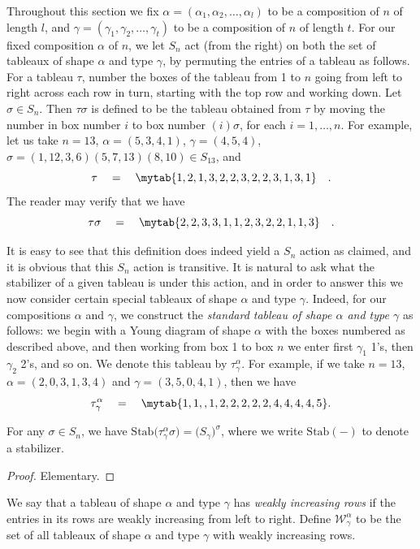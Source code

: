Throughout this section we fix $\alpha = (\alpha_1,\alpha_2,\ldots,\alpha_l)$ to be a composition of $n$ of length $l$, and
$\gamma = (\gamma_1,\gamma_2,\ldots,\gamma_t)$ to be a composition of $n$ of length $t$.
For our fixed composition $\alpha$ of $n$, we let $S_n$ act (from the right) on both the set of tableaux of shape $\alpha$ and type
$\gamma$, by permuting the entries of a tableau as follows.
For a tableau $\tau$, number the boxes of the tableau from 1 to $n$ going from left to right across each row in turn, starting with the
top row and working down. Let $\sigma \in S_n$. Then $\tau\sigma$ is defined to be the tableau obtained from $\tau$ by moving the number
in box number $i$ to box number $(i)\sigma$, for each $i=1,\ldots,n$. For example, let us take $n=13$,
$\alpha = (5,3,4,1)$, $\gamma = (4,5,4)$, $\sigma = (1,12,3,6)(5,7,13)(8,10) \in S_{13}$, and
\[
\tau \quad=\quad 
\mytab{
{{1,2,1,3,2},
{2,3,2},
{2,3,1,3},
{1}}
}\quad.
\]
The reader may verify that we have
\[
\tau\sigma \quad=\quad 
\mytab{
{{2,2,3,3,1},
{1,2,3},
{2,2,1,1},
{3}}
}\quad.\]

It is easy to see that this definition does indeed yield a $S_n$ action as claimed, and it is obvious that this $S_n$ action is
transitive. It is natural to ask what the stabilizer of a given tableau is under this action, and in order to answer this we now consider
certain special tableaux of shape $\alpha$ and type $\gamma$. Indeed, for our compositions $\alpha$ and $\gamma$, we
construct the \textit{standard tableau of shape $\alpha$ and type $\gamma$} as follows: we begin with a Young diagram of shape $\alpha$
with the boxes numbered as described above, and then working from box 1 to box $n$ we enter first $\gamma_1$ 1's, then $\gamma_2$ 2's,
and so on. We denote this tableau by $\tau^\alpha_{\gamma}$. For example, if we take
$n=13$, $\alpha = (2,0,3,1,3,4)$ and $\gamma=(3,5,0,4,1)$, then we have
\[
\tau^\alpha_{\gamma}\quad=\quad
\mytab{
{{1,1},
{},
{1,2,2},
{2},
{2,2,4},
{4,4,4,5}}
}.
\]

\begin{prop}\label{tab_stab:prop}
For any $\sigma \in S_n$, we have $\mathrm{Stab}\bigl(\tau^\alpha_\gamma\sigma\bigr) = \bigl(S_\gamma\bigr)^\sigma$,
where we write $\mathrm{Stab}(-)$ to denote a stabilizer.
\end{prop}
\begin{proof}Elementary.\end{proof}

We say that a tableau of shape $\alpha$ and type $\gamma$ has \textit{weakly increasing rows} if the entries in its rows are weakly
increasing from left to right. Define $\mathcal{W}^\alpha_{\gamma}$ to be the set of all tableaux of shape $\alpha$ and type
$\gamma$ with weakly increasing rows.

